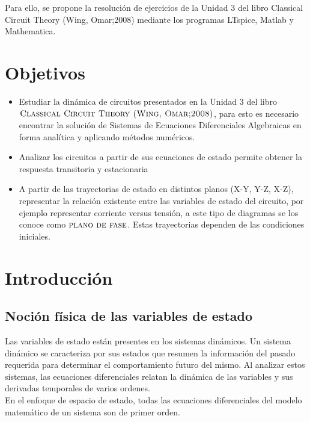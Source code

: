 \documentclass[10pt,a4paper]{article} %
\begin{document}
	Para ello, se propone la resolución de ejercicios de la Unidad 3 del libro Classical Circuit Theory (Wing, Omar;2008) mediante los programas LTspice, Matlab y Mathematica.  \\
		
	\newpage
	
	\tableofcontents
	\newpage
	\section{Objetivos}
	\begin{itemize}
		\item Estudiar la dinámica de circuitos presentados en la Unidad 3 del libro $\textsc{Classical Circuit Theory (Wing, Omar;2008)}$, para esto es necesario encontrar la solución de Sistemas de Ecuaciones Diferenciales Algebraicas en forma analítica y aplicando métodos numéricos.
		
		\item Analizar los circuitos a partir de sus ecuaciones de estado permite obtener la respuesta transitoria y estacionaria
		
		\item A partir de las trayectorias de estado en distintos planos (X-Y, Y-Z, X-Z), representar la relación existente entre las variables de estado del circuito, por ejemplo representar corriente versus tensión, a este tipo de diagramas se los conoce como $\textsc{plano de fase}$. Estas trayectorias dependen de las condiciones iniciales.	
	\end{itemize}
	
	\section{Introducción}
	
	\subsection{Noción física de las variables de estado}
	
	Las variables de estado están presentes en los sistemas dinámicos. Un sistema dinámico se caracteriza por sus estados que resumen la información del pasado requerida para determinar el comportamiento futuro del mismo. Al analizar estos sistemas, las ecuaciones diferenciales relatan la dinámica de las variables y sus derivadas temporales de varios ordenes. \\
	
	En el enfoque de espacio de estado, todas las ecuaciones diferenciales del modelo matemático de un sistema son de primer orden.\\
	
\end{document}
